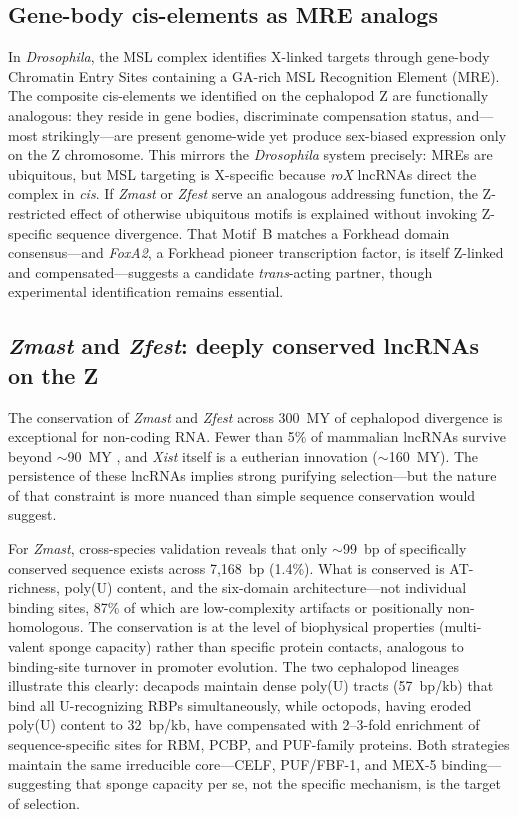 \documentclass[12pt]{article}
\newcommand{\citep}{\parencite}
\begin{document}
\subsection*{Gene-body cis-elements as MRE analogs}

In \textit{Drosophila}, the MSL complex identifies X-linked targets
through gene-body Chromatin Entry Sites
containing a GA-rich MSL Recognition Element (MRE).
The composite cis-elements we identified on the cephalopod Z
are functionally analogous:
they reside in gene bodies, discriminate compensation status,
and---most strikingly---are present genome-wide
yet produce sex-biased expression only on the Z chromosome.
This mirrors the \textit{Drosophila} system precisely:
MREs are ubiquitous, but MSL targeting is X-specific
because \textit{roX} lncRNAs direct the complex in \textit{cis}.
If \textit{Zmast} or \textit{Zfest} serve an analogous addressing function,
the Z-restricted effect of otherwise ubiquitous motifs
is explained without invoking Z-specific sequence divergence.
That Motif~B matches a Forkhead domain consensus---and
\textit{FoxA2}, a Forkhead pioneer transcription factor,
is itself Z-linked and compensated---suggests
a candidate \textit{trans}-acting partner,
though experimental identification remains essential.

\subsection*{\textit{Zmast} and \textit{Zfest}: deeply conserved lncRNAs on the Z}

The conservation of \textit{Zmast} and \textit{Zfest}
across 300~MY of cephalopod divergence
is exceptional for non-coding RNA.
Fewer than 5\% of mammalian lncRNAs survive beyond $\sim$90~MY
\citep{hezroni2015principles},
and \textit{Xist} itself is a eutherian innovation ($\sim$160~MY).
The persistence of these lncRNAs implies strong purifying selection---but
the nature of that constraint is more nuanced
than simple sequence conservation would suggest.

For \textit{Zmast}, cross-species validation reveals
that only $\sim$99~bp of specifically conserved sequence exists
across 7,168~bp (1.4\%).
What is conserved is AT-richness, poly(U) content,
and the six-domain architecture---not individual binding sites,
87\% of which are low-complexity artifacts
or positionally non-homologous.
The conservation is at the level of biophysical properties
(multi-valent sponge capacity) rather than specific protein contacts,
analogous to binding-site turnover in promoter evolution.
The two cephalopod lineages illustrate this clearly:
decapods maintain dense poly(U) tracts (57~bp/kb)
that bind all U-recognizing RBPs simultaneously,
while octopods, having eroded poly(U) content to 32~bp/kb,
have compensated with 2--3-fold enrichment of sequence-specific sites
for RBM, PCBP, and PUF-family proteins.
Both strategies maintain the same irreducible core---CELF,
PUF/FBF-1, and MEX-5 binding---suggesting
that sponge capacity per se, not the specific mechanism,
is the target of selection.
\end{document}
